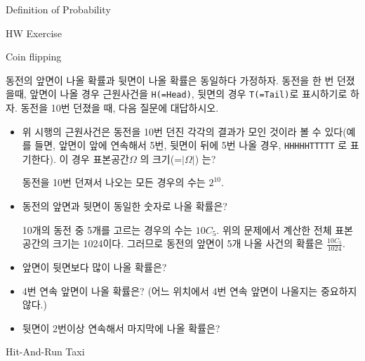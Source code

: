 \begin{edXchapter}{Definition of Probability}

\begin{edXsection}{HW Exercise}

\begin{edXvertical}

\begin{edXproblem}{Coin flipping}

동전의 앞면이 나올 확률과 뒷면이 나올 확률은 동일하다 가정하자. 동전을 한 번 던졌을때,
앞면이 나올 경우 근원사건을 {\tt H(=Head)}, 뒷면의 경우 {\tt T(=Tail)}로 표시하기로 하자.
동전을 10번 던졌을 때, 다음 질문에 대답하시오.


\begin{itemize}
\item 위 시행의 근원사건은 동전을 10번 던진 각각의  결과가 모인 것이라 볼 수 있다(예를 들면, 앞면이 앞에 연속해서 5번, 뒷면이 뒤에 5번 나올 경우, {\tt HHHHHTTTTT} 로 표기한다).  
이 경우 표본공간$\Omega$ 의 크기(=$|\Omega|$) 는?
\begin{edXsolution}
동전을 10번 던져서 나오는 모든 경우의 수는 $2^10$.
\end{edXsolution}
\item 동전의 앞면과 뒷면이 동일한 숫자로 나올 확률은?
\begin{edXsolution}
10개의 동전 중 5개를 고르는 경우의 수는 $10C_5$.
위의 문제에서 계산한 전체 표본공간의 크기는 1024이다. 그러므로 동전의 앞면이 5개 나올 사건의 확률은 $\frac{10C_5}{1024}$.
\end{edXsolution}
\item 앞면이 뒷면보다 많이 나올 확률은?
\item 4번 연속 앞면이 나올 확률은? (어느 위치에서 4번 연속 앞면이 나올지는 중요하지 않다.) 
\item 뒷면이 2번이상 연속해서 마지막에 나올 확률은? 
\end{itemize}

\end{edXproblem}

\begin{edXproblem}{Hit-And-Run Taxi}


\end{edXproblem}
\end{edXvertical}
\end{edXsection}
\end{edXchapter}
